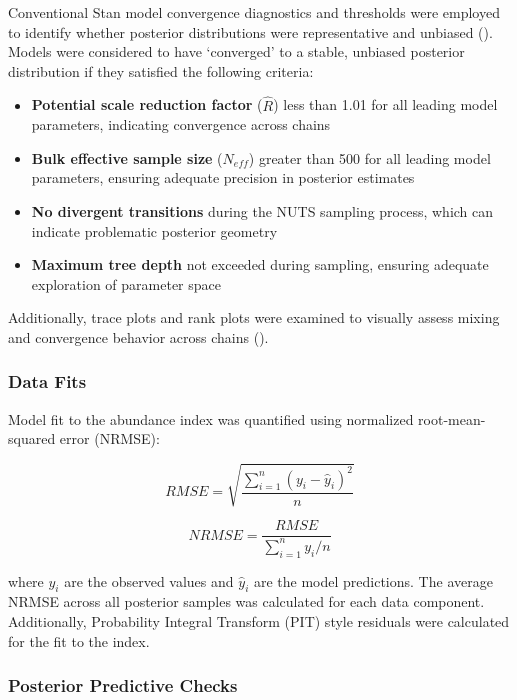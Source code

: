 \documentclass[
  11pt,
]{SCreport}
\providecommand{\tightlist}{%
  \setlength{\itemsep}{0pt}\setlength{\parskip}{0pt}}\usepackage{longtable,booktabs,array}
\begin{document}
Conventional Stan model convergence diagnostics and thresholds were
employed to identify whether posterior distributions were representative
and unbiased ().
Models were considered to have `converged' to a stable, unbiased
posterior distribution if they satisfied the following criteria:

\begin{itemize}
\tightlist
\item
  \textbf{Potential scale reduction factor} (\(\hat{R}\)) less than 1.01
  for all leading model parameters, indicating convergence across chains
\item
  \textbf{Bulk effective sample size} (\(N_{eff}\)) greater than 500 for
  all leading model parameters, ensuring adequate precision in posterior
  estimates\\
\item
  \textbf{No divergent transitions} during the NUTS sampling process,
  which can indicate problematic posterior geometry
\item
  \textbf{Maximum tree depth} not exceeded during sampling, ensuring
  adequate exploration of parameter space
\end{itemize}

Additionally, trace plots and rank plots were examined to visually
assess mixing and convergence behavior across chains
().

\subsubsection{Data Fits}\label{sec-data-fits}

Model fit to the abundance index was quantified using normalized
root-mean-squared error (NRMSE):

\[RMSE = \sqrt{\frac{\sum_{i=1}^{n} (y_i - \hat{y}_i)^2}{n}}\]

\[NRMSE = \frac{RMSE}{\sum_{i=1}^{n} y_i / n}\]

where \(y_i\) are the observed values and \(\hat{y}_i\) are the model
predictions. The average NRMSE across all posterior samples was
calculated for each data component. Additionally, Probability Integral
Transform (PIT) style residuals were calculated for the fit to the
index.

\subsubsection{Posterior Predictive
Checks}\label{sec-posterior-predictive-checks}
\end{document}
